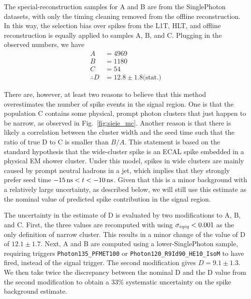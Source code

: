 The special-reconstruction samples for A and B are from the SinglePhoton datasets, with only the timing cleaning removed from the offline reconstruction.
In this way, the selection bias over spikes from the L1T, HLT, and offline reconstruction is equally applied to samples A, B, and C. Plugging in the observed numbers, we have
\begin{align*}
  A & = 4969 \\
  B & = 1180 \\
  C & = 54 \\
  \therefore D & = 12.8 \pm 1.8 \text{(stat.)}
\end{align*}

There are, however, at least two reasons to believe that this method overestimates the number of spike events in the signal region. 
One is that the population C contains some physical, prompt photon clusters that just happen to be narrow, as observed in Fig.~\ref{fig:sieie_mc}. 
Another reason is that there is likely a correlation between the cluster width and the seed time such that the ratio of true D to C is smaller than $B/A$.
This statement is based on the standard hypothesis that the wide-cluster spike is an ECAL spike embedded in a physical EM shower cluster. 
Under this model, spikes in wide clusters are mainly caused by prompt neutral hadrons in a jet, which implies that they strongly prefer seed time $-15\, \text{ns} < t < -10\, \text{ns}$. 
Given that this is a minor background with a relatively large uncertainty, as described below, we will still use this estimate as the nominal value of predicted spike contribution in the signal region.

The uncertainty in the estimate of D is evaluated by two modifications to A, B, and C.
First, the three values are recomputed with using $\sigma_{i\eta i\eta} < 0.001$ as the only definition of narrow cluster. 
This results in a minor change of the value of D of $12.1 \pm 1.7$. Next, A and B are computed using a lower-\pt SinglePhoton sample, requiring triggers \texttt{Photon135\_PFMET100} or \texttt{Photon120\_R9Id90\_HE10\_IsoM} to have fired, instead of the signal trigger. 
The second modification gives $D=9.1 \pm 1.3$. 
We then take twice the discrepancy between the nominal D and the D value from the second modification to obtain a 33\% systematic uncertainty on the spike background estimate.
